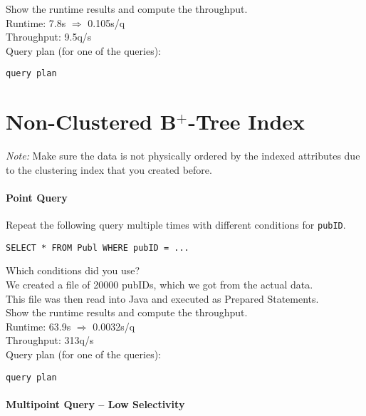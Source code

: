 \documentclass[11pt]{scrartcl}
\begin{document}
\smallskip\noindent
Show the runtime results and compute the throughput.\\
Runtime: 7.8s $\Rightarrow$ 0.105s/q\\
Throughput: 9.5q/s\\

\smallskip\noindent
Query plan (for one of the queries):
{\small
\begin{verbatim}
query plan
\end{verbatim}
}

\section{Non-Clustered B$^+$-Tree Index}

\noindent \emph{Note:} Make sure the data is not physically ordered by
the indexed attributes due to the clustering index that you created
before.

\paragraph{Point Query}

Repeat the following query multiple times with different conditions for {\tt pubID}.

{\small
\begin{verbatim}
SELECT * FROM Publ WHERE pubID = ...
\end{verbatim}
}

\noindent
Which conditions did you use?\\
We created a file of 20000 pubIDs, which we got from the actual data.\\
This file was then read into Java and executed as Prepared Statements.\\

\smallskip\noindent
Show the runtime results and compute the throughput.\\
Runtime: 63.9s $\Rightarrow$ 0.0032s/q\\
Throughput: 313q/s\\

\smallskip\noindent
Query plan (for one of the queries):
{\small
\begin{verbatim}
query plan
\end{verbatim}
}


\paragraph{Multipoint Query -- Low Selectivity}
\end{document}
